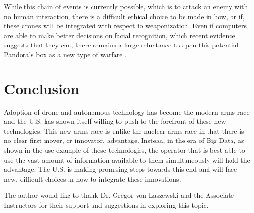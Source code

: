 \documentclass[sigconf]{acmart}
\begin{document}
While this chain of events is currently possible, which is to attack an enemy with no human interaction, there is a difficult ethical choice to be made in how, or if, these drones will be integrated with respect to weaponization. Even if computers are able to make better decisions on facial recognition, which recent evidence suggests that they can, there remains a large reluctance to open this potential Pandora's box as a new type of warfare \cite{googleface}. 

\section{Conclusion}
Adoption of drone and autonomous technology has become the modern arms race and the U.S. has shown itself willing to push to the forefront of these new technologies. This new arms race is unlike the nuclear arms race in that there is no clear first mover, or innovator, advantage. Instead, in the era of Big Data, as shown in the use example of these technologies, the operator that is best able to use the vast amount of information available to them simultaneously will hold the advantage. The U.S. is making promising steps towards this end and will face new, difficult choices in how to integrate these innovations.


 
 
 
\begin{acks}
The author would like to thank Dr. Gregor von Laszewski and the Associate Instructors for their support and suggestions in exploring this topic.
\end{acks}


 
\end{document}
